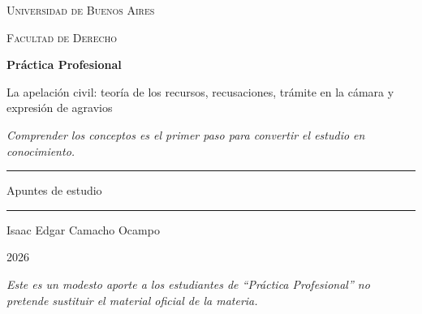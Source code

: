 \documentclass[12pt,oneside]{book}
\newcommand{\universidad}{Universidad de Buenos Aires}
\newcommand{\facultad}{Facultad de Derecho}
\newcommand{\materia}{Práctica Profesional}
\newcommand{\titulo}{La apelación civil: teoría de los recursos, recusaciones, trámite en la cámara y expresión de agravios}
\newcommand{\autor}{Isaac Edgar Camacho Ocampo}
\newcommand{\anio}{2026}
\begin{document}
\begin{titlepage}

\thispagestyle{empty}

\begin{center}

\vspace*{1cm}

{\large \textsc{\universidad}}

\vspace{0.2cm}

{\large \textsc{\facultad}}

\vspace{3cm}

{\Huge \textbf{\materia}}

\vspace{1cm}

{\LARGE \titulo}

\vspace{0.8cm}

\textit{Comprender los conceptos es el primer paso para convertir el estudio en conocimiento.}

\vspace{1.2cm}

\rule{0.70\textwidth}{0.5pt}

\vspace{0.5cm}

{\large Apuntes de estudio}

\vspace{0.5cm}

\rule{0.70\textwidth}{0.5pt}

\vfill

{\large \autor}

\vspace{0.3cm}

{\large \anio}

\end{center}

\vfill

\begin{flushleft}
\textit{Este es un modesto aporte a los estudiantes de ``Práctica Profesional'' no pretende sustituir el material oficial de la materia.}
\end{flushleft}

\end{titlepage}

\tableofcontents

\end{document}
